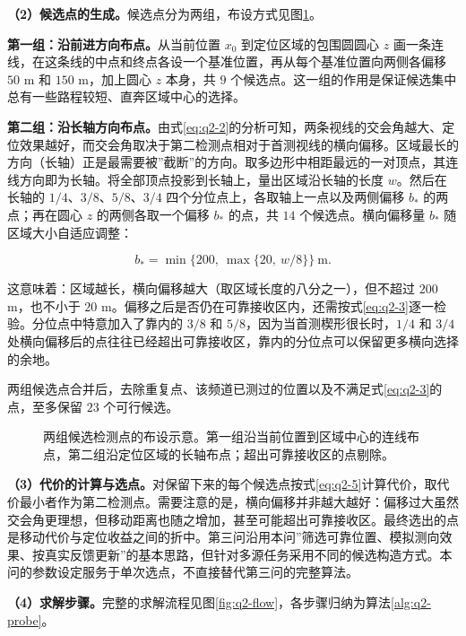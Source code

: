 \textbf{（2）候选点的生成。}候选点分为两组，布设方式见图\ref{fig:q2-cand}。

\textbf{第一组：沿前进方向布点。}从当前位置 $x_0$ 到定位区域的包围圆圆心 $z$ 画一条连线，在这条线的中点和终点各设一个基准位置，再从每个基准位置向两侧各偏移 $50$ m 和 $150$ m，加上圆心 $z$ 本身，共 $9$ 个候选点。这一组的作用是保证候选集中总有一些路程较短、直奔区域中心的选择。

\textbf{第二组：沿长轴方向布点。}由式\eqref{eq:q2-2}的分析可知，两条视线的交会角越大、定位效果越好，而交会角取决于第二检测点相对于首测视线的横向偏移。区域最长的方向（长轴）正是最需要被”截断”的方向。取多边形中相距最远的一对顶点，其连线方向即为长轴。将全部顶点投影到长轴上，量出区域沿长轴的长度 $w$。然后在长轴的 $1/4$、$3/8$、$5/8$、$3/4$ 四个分位点上，各取轴上一点以及两侧偏移 $b_*$ 的两点；再在圆心 $z$ 的两侧各取一个偏移 $b_*$ 的点，共 $14$ 个候选点。横向偏移量 $b_*$ 随区域大小自适应调整：

\begin{equation}\label{eq:q2-7}
b_*=\min\{200,\ \max\{20,\ w/8\}\}\ \text{m}.
\end{equation}

这意味着：区域越长，横向偏移越大（取区域长度的八分之一），但不超过 $200$ m，也不小于 $20$ m。偏移之后是否仍在可靠接收区内，还需按式\eqref{eq:q2-3}逐一检验。分位点中特意加入了靠内的 $3/8$ 和 $5/8$，因为当首测楔形很长时，$1/4$ 和 $3/4$ 处横向偏移后的点往往已经超出可靠接收区，靠内的分位点可以保留更多横向选择的余地。

两组候选点合并后，去除重复点、该频道已测过的位置以及不满足式\eqref{eq:q2-3}的点，至多保留 $23$ 个可行候选。

\begin{figure}[!htbp]
\centering
\QTwoCandidateFigure
\caption{两组候选检测点的布设示意。第一组沿当前位置到区域中心的连线布点，第二组沿定位区域的长轴布点；超出可靠接收区的点剔除。}
\label{fig:q2-cand}
\end{figure}

\textbf{（3）代价的计算与选点。}对保留下来的每个候选点按式\eqref{eq:q2-5}计算代价，取代价最小者作为第二检测点。需要注意的是，横向偏移并非越大越好：偏移过大虽然交会角更理想，但移动距离也随之增加，甚至可能超出可靠接收区。最终选出的点是移动代价与定位收益之间的折中。第三问沿用本问”筛选可靠位置、模拟测向效果、按真实反馈更新”的基本思路，但针对多源任务采用不同的候选构造方式。本问的参数设定服务于单次选点，不直接替代第三问的完整算法。

\FloatBarrier
\textbf{（4）求解步骤。}完整的求解流程见图\ref{fig:q2-flow}，各步骤归纳为算法\ref{alg:q2-probe}。

